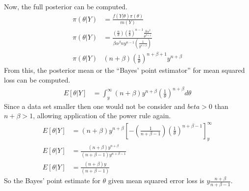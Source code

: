 \documentclass[11pt]{article}
\begin{document}
Now, the full posterior can be computed.
\begin{align*}
\pi(\theta|Y) &=\frac{ f(Y| \theta) \pi (\theta)}{m(Y)} \\
\pi(\theta|Y) &=\frac{\left( \frac{n}{\theta} \right)\left(\frac{y}{\theta} \right)^{n-1} \frac{\beta \alpha^\beta}{\theta^{\beta+1}}}{\beta \alpha^\beta n y^{n-1} \left( \frac{1}{y^{n+\beta}} \right) } \\
\pi(\theta|Y) & (n + \beta) \left( \frac{1}{\theta} \right)^{n+\beta+1} y^{n+\beta} 
\end{align*}
From this, the posterior mean or the ``Bayes' point estimator'' for mean squared loss can be computed.
\begin{align*}
E[\theta|Y] &= \int_{y}^\infty (n+\beta) y^{n+\beta}\left(  \frac{1}{\theta} \right)^{n+\beta} d\theta 
\end{align*}
Since a data set smaller then one would not be consider and $beta>0$ than $n+\beta>1$, allowing application of the power rule again. \begin{align*}
E[\theta|Y] &=  (n+\beta) y^{n+\beta} \left[ - \left( \frac{1}{n+\beta-1} \right) \left(  \frac{1}{\theta} \right)^{n+\beta-1} \right]_y^\infty \\
E[\theta|Y] &= \frac{(n+\beta) y^{n+\beta}}{(n+\beta-1)y^{n+\beta-1}} \\
E[\theta|Y] &= \frac{(n+\beta) y}{(n+\beta-1)} 
\end{align*}
So the Bayes' point estimate for $\theta$ given mean squared error loss is $y\frac{n+\beta}{n+\beta-1}$. 

\newpage
\end{document}
